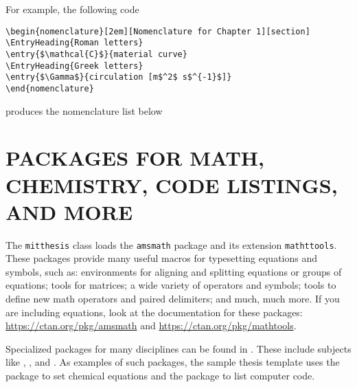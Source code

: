 \documentclass[11pt]{article}
\begin{document}
For example, the following code 
\begin{center}
\begin{minipage}{0.8\textwidth}
\begin{verbatim}
\begin{nomenclature}[2em][Nomenclature for Chapter 1][section]
\EntryHeading{Roman letters}
\entry{$\mathcal{C}$}{material curve}
\EntryHeading{Greek letters}
\entry{$\Gamma$}{circulation [m$^2$ s$^{-1}$]}
\end{nomenclature}
\end{verbatim}
\end{minipage}
\end{center}
produces the nomenclature list below
\begin{center}
\begin{minipage}{0.8\textwidth}
\begin{nomenclature}
\end{nomenclature}
\end{minipage}
\end{center}

\section*{PACKAGES FOR MATH, CHEMISTRY, CODE LISTINGS, AND MORE}
The \texttt{mitthesis} class loads the \texttt{amsmath} package and its extension \texttt{mathttools}. These packages provide many useful macros for typesetting equations and symbols, such as: environments for aligning and splitting equations or groups of equations; tools for matrices; a wide variety of operators and symbols; tools to define new math operators and paired delimiters; and much, much more. If you are including equations, look at the documentation for these packages: \url{https://ctan.org/pkg/amsmath} and \url{https://ctan.org/pkg/mathtools}.

Specialized packages for many disciplines can be found in .  These include subjects like , , and .  As examples of such packages, the sample thesis template uses the package \texttt{} to set chemical equations and the package \texttt{} to list computer code.
\end{document}
